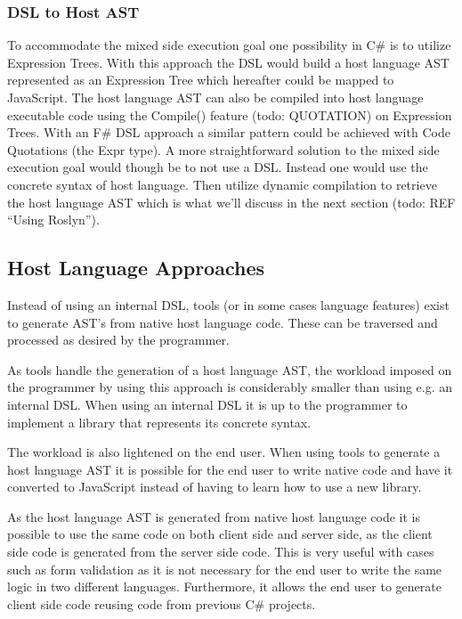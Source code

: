 		\subsubsection{DSL to Host AST} %
		\label{sub:dsl_to_host_ast}
			To accommodate the mixed side execution goal one possibility in C\# is to utilize Expression Trees. With this approach the DSL would build a host language AST represented as an Expression Tree which hereafter could be mapped to JavaScript. The host language AST can also be compiled into host language executable code using the Compile() feature (todo: QUOTATION) on Expression Trees. With an F\# DSL approach a similar pattern could be achieved with Code Quotations (the Expr type). A more straightforward solution to the mixed side execution goal would though be to not use a DSL. Instead one would use the concrete syntax of host language. Then utilize dynamic compilation to retrieve the host language AST which is what we’ll discuss in the next section (todo: REF ``Using Roslyn'').


	\subsection{Host Language Approaches} %
	\label{sub:host_language_approaches}
		Instead of using an internal DSL, tools (or in some cases language features) exist to generate AST’s from native host language code. These can be traversed and processed as desired by the programmer.

		As tools handle the generation of a host language AST, the workload imposed on the programmer by using this approach is considerably smaller than using e.g. an internal DSL. When using an internal DSL it is up to the programmer to implement a library that represents its concrete syntax.

		The workload is also lightened on the end user. When using tools to generate a host language AST it is possible for the end user to write native code and have it converted to JavaScript instead of having to learn how to use a new library.

		As the host language AST is generated from native host language code it is possible to use the same code on both client side and server side, as the client side code is generated from the server side code. This is very useful with cases such as form validation as it is not necessary for the end user to write the same logic in two different languages. Furthermore, it allows the end user to generate client side code reusing code from previous C\# projects.

